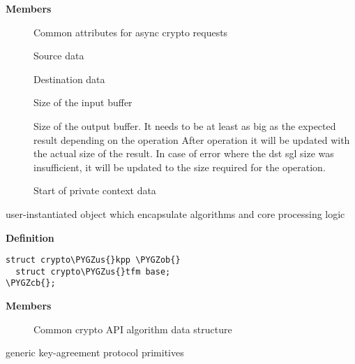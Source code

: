 \documentclass[a4paper,8pt,english]{sphinxmanual}
\def\PYGZus{\char`\_}
\def\PYGZob{\char`\{}
\def\PYGZcb{\char`\}}
\begin{document}
\textbf{Members}
\begin{description}
\item[{}] \leavevmode
Common attributes for async crypto requests

\item[{}] \leavevmode
Source data

\item[{}] \leavevmode
Destination data

\item[{}] \leavevmode
Size of the input buffer

\item[{}] \leavevmode
Size of the output buffer. It needs to be at least
as big as the expected result depending on the operation
After operation it will be updated with the actual size of the
result. In case of error where the dst sgl size was insufficient,
it will be updated to the size required for the operation.

\item[{}] \leavevmode
Start of private context data

\end{description}

\begin{fulllineitems}
\label{crypto/api-kpp:c.crypto_kpp}
user-instantiated object which encapsulate algorithms and core processing logic

\end{fulllineitems}


\textbf{Definition}

\begin{Verbatim}[commandchars=\\\{\}]
struct crypto\PYGZus{}kpp \PYGZob{}
  struct crypto\PYGZus{}tfm base;
\PYGZcb{};
\end{Verbatim}

\textbf{Members}
\begin{description}
\item[{}] \leavevmode
Common crypto API algorithm data structure

\end{description}

\begin{fulllineitems}
\label{crypto/api-kpp:c.kpp_alg}
generic key-agreement protocol primitives

\end{fulllineitems}
\end{document}
